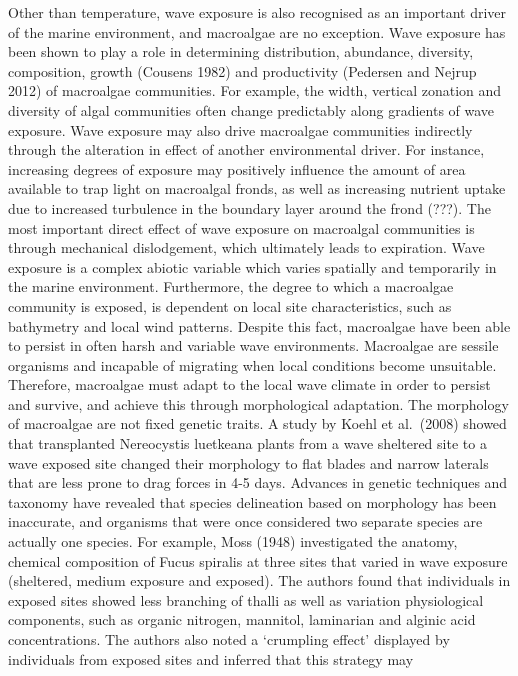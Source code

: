 \documentclass[
]{article}
\begin{document}
Other than temperature, wave exposure is also recognised as an important
driver of the marine environment, and macroalgae are no exception. Wave
exposure has been shown to play a role in determining distribution,
abundance, diversity, composition, growth (Cousens 1982) and
productivity (Pedersen and Nejrup 2012) of macroalgae communities. For
example, the width, vertical zonation and diversity of algal communities
often change predictably along gradients of wave exposure. Wave exposure
may also drive macroalgae communities indirectly through the alteration
in effect of another environmental driver. For instance, increasing
degrees of exposure may positively influence the amount of area
available to trap light on macroalgal fronds, as well as increasing
nutrient uptake due to increased turbulence in the boundary layer around
the frond (???). The most important direct effect of wave exposure on
macroalgal communities is through mechanical dislodgement, which
ultimately leads to expiration. Wave exposure is a complex abiotic
variable which varies spatially and temporarily in the marine
environment. Furthermore, the degree to which a macroalgae community is
exposed, is dependent on local site characteristics, such as bathymetry
and local wind patterns. Despite this fact, macroalgae have been able to
persist in often harsh and variable wave environments. Macroalgae are
sessile organisms and incapable of migrating when local conditions
become unsuitable. Therefore, macroalgae must adapt to the local wave
climate in order to persist and survive, and achieve this through
morphological adaptation. The morphology of macroalgae are not fixed
genetic traits. A study by Koehl et al.~(2008) showed that transplanted
Nereocystis luetkeana plants from a wave sheltered site to a wave
exposed site changed their morphology to flat blades and narrow laterals
that are less prone to drag forces in 4-5 days. Advances in genetic
techniques and taxonomy have revealed that species delineation based on
morphology has been inaccurate, and organisms that were once considered
two separate species are actually one species. For example, Moss (1948)
investigated the anatomy, chemical composition of Fucus spiralis at
three sites that varied in wave exposure (sheltered, medium exposure and
exposed). The authors found that individuals in exposed sites showed
less branching of thalli as well as variation physiological components,
such as organic nitrogen, mannitol, laminarian and alginic acid
concentrations. The authors also noted a `crumpling effect' displayed by
individuals from exposed sites and inferred that this strategy may
\end{document}
